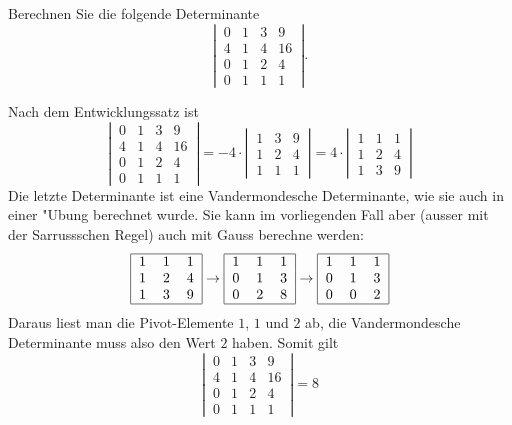 Berechnen Sie die folgende Determinante
\[
\left|\,\begin{matrix}
0&1&3&9\\
4&1&4&16\\
0&1&2&4\\
0&1&1&1
\end{matrix}\,\right|.
\]

\begin{loesung}
Nach dem Entwicklungssatz ist
\[
\left|\,\begin{matrix}
0&1&3&9\\
4&1&4&16\\
0&1&2&4\\
0&1&1&1
\end{matrix}\,\right|
=-4\cdot\left|\,\begin{matrix}
1&3&9\\
1&2&4\\
1&1&1
\end{matrix}\,\right|
=
4\cdot\left|\,\begin{matrix}
1&1&1\\
1&2&4\\
1&3&9
\end{matrix}\,\right|
\]
Die letzte Determinante ist eine Vandermondesche Determinante,
wie sie auch in einer "Ubung berechnet wurde. Sie kann im vorliegenden
Fall aber (ausser mit der Sarrussschen Regel) auch mit Gauss
berechne werden:
\[
\begin{tabular}{|ccc|}
\hline
1&1&1\\
1&2&4\\
1&3&9\\
\hline
\end{tabular}
\rightarrow
\begin{tabular}{|ccc|}
\hline
1&1&1\\
0&1&3\\
0&2&8\\
\hline
\end{tabular}
\rightarrow
\begin{tabular}{|ccc|}
\hline
1&1&1\\
0&1&3\\
0&0&2\\
\hline
\end{tabular}
\]
Daraus liest man die Pivot-Elemente $1$, $1$ und $2$ ab, die
Vandermondesche Determinante muss also den Wert $2$ haben.
Somit gilt
\[
\left|\,\begin{matrix}
0&1&3&9\\
4&1&4&16\\
0&1&2&4\\
0&1&1&1
\end{matrix}\,\right|
= 8
\]
\end{loesung}

